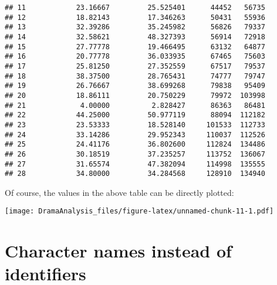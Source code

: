 \documentclass[]{book}
\newenvironment{Shaded}{\begin{snugshade}}{\end{snugshade}}
\newcommand{\CommentTok}[1]{\textcolor[rgb]{0.56,0.35,0.01}{\textit{#1}}}
\newcommand{\DataTypeTok}[1]{\textcolor[rgb]{0.13,0.29,0.53}{#1}}
\newcommand{\DecValTok}[1]{\textcolor[rgb]{0.00,0.00,0.81}{#1}}
\newcommand{\KeywordTok}[1]{\textcolor[rgb]{0.13,0.29,0.53}{\textbf{#1}}}
\newcommand{\NormalTok}[1]{#1}
\newcommand{\OperatorTok}[1]{\textcolor[rgb]{0.81,0.36,0.00}{\textbf{#1}}}
\newcommand{\OtherTok}[1]{\textcolor[rgb]{0.56,0.35,0.01}{#1}}
\newcommand{\StringTok}[1]{\textcolor[rgb]{0.31,0.60,0.02}{#1}}
\begin{document}
\begin{verbatim}
## 11            23.16667         25.525401      44452   56735
## 12            18.82143         17.346263      50431   55936
## 13            32.39286         35.245982      56826   79337
## 14            32.58621         48.327393      56914   72918
## 15            27.77778         19.466495      63132   64877
## 16            20.77778         36.033935      67465   75603
## 17            25.81250         27.352559      67517   79537
## 18            38.37500         28.765431      74777   79747
## 19            26.76667         38.699268      79838   95409
## 20            18.86111         20.750229      79972  103998
## 21             4.00000          2.828427      86363   86481
## 22            44.25000         50.977119      88094  112182
## 23            23.53333         18.528140     101533  112733
## 24            33.14286         29.952343     110037  112526
## 25            24.41176         36.802600     112824  134486
## 26            30.18519         37.235257     113752  136067
## 27            31.65574         47.382094     114998  135555
## 28            34.80000         34.284568     128910  134940
\end{verbatim}

Of course, the values in the above table can be directly plotted:

\begin{Shaded}
\end{Shaded}

\texttt{[image: DramaAnalysis\_files/figure-latex/unnamed-chunk-11-1.pdf]}

\hypertarget{format}{%
\section{Character names instead of identifiers}\label{format}}
\end{document}
